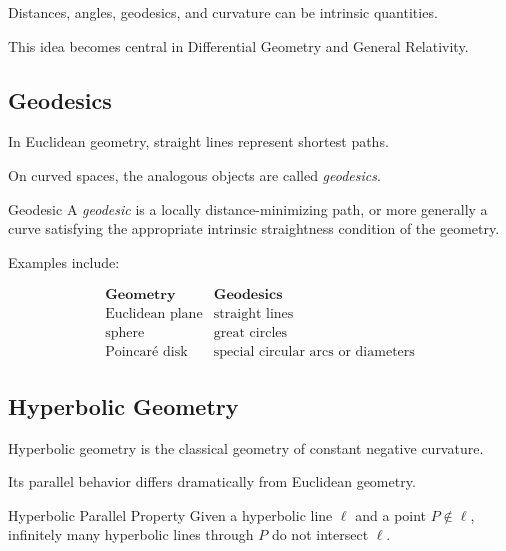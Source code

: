 Distances, angles, geodesics, and curvature can be intrinsic quantities.

This idea becomes central in Differential Geometry and General Relativity.

\subsection{Geodesics}
\label{subsec:non-euclidean-geodesics}

In Euclidean geometry, straight lines represent shortest paths.

On curved spaces, the analogous objects are called \emph{geodesics}.

\begin{definitionbox}{Geodesic}
A \emph{geodesic} is a locally distance-minimizing path, or more generally a
curve satisfying the appropriate intrinsic straightness condition of the
geometry.
\end{definitionbox}

Examples include:

\[
\begin{array}{c|c}
\textbf{Geometry} & \textbf{Geodesics}\\
\hline
\text{Euclidean plane} & \text{straight lines}\\
\text{sphere} & \text{great circles}\\
\text{Poincar\'e disk} &
\text{special circular arcs or diameters}
\end{array}
\]

\subsection{Hyperbolic Geometry}
\label{subsec:hyperbolic-geometry}

Hyperbolic geometry is the classical geometry of constant negative
curvature.

Its parallel behavior differs dramatically from Euclidean geometry.

\begin{definitionbox}{Hyperbolic Parallel Property}
Given a hyperbolic line \(\ell\) and a point \(P\notin\ell\), infinitely
many hyperbolic lines through \(P\) do not intersect \(\ell\).
\end{definitionbox}

